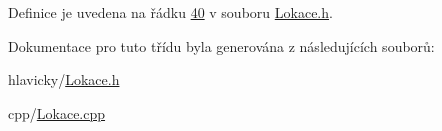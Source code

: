 Definice je uvedena na řádku \hyperlink{Lokace_8h_source_l00040}{40} v souboru \hyperlink{Lokace_8h_source}{Lokace.\+h}.



Dokumentace pro tuto třídu byla generována z následujících souborů\+:\begin{DoxyCompactItemize}
\item 
hlavicky/\hyperlink{Lokace_8h}{Lokace.\+h}\item 
cpp/\hyperlink{Lokace_8cpp}{Lokace.\+cpp}\end{DoxyCompactItemize}
